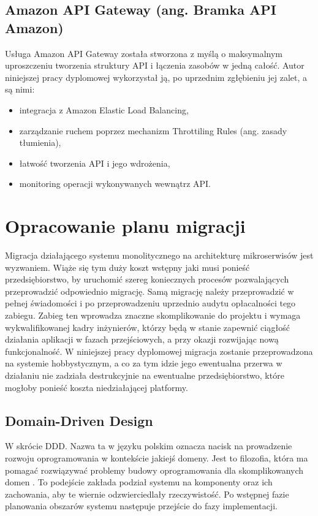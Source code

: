 \documentclass[12pt,oneside]{book}
\begin{document}
    \subsection{Amazon API Gateway (ang. Bramka API Amazon)}
    Usługa Amazon API Gateway została stworzona z myślą o maksymalnym uproszczeniu tworzenia struktury API i łączenia zasobów w jedną całość. Autor niniejszej pracy dyplomowej wykorzystał ją, po uprzednim zgłębieniu jej zalet, a są nimi:

    \begin{itemize}
        \item integracja z Amazon Elastic Load Balancing,
        \item zarządzanie ruchem poprzez mechanizm Throttiling Rules (ang. zasady tłumienia),
        \item łatwość tworzenia API i jego wdrożenia,
        \item monitoring operacji wykonywanych wewnątrz API. \cite{aws.api.gateway}
    \end{itemize}


    \section{Opracowanie planu migracji}
    Migracja działającego systemu monolitycznego na architekturę mikroserwisów jest wyzwaniem. Wiąże się tym duży koszt wstępny jaki musi ponieść przedsiębiorstwo, by uruchomić szereg koniecznych procesów pozwalających przeprowadzić odpowiednio migrację. Samą migrację należy przeprowadzić w pełnej świadomości i po przeprowadzeniu uprzednio audytu opłacalności tego zabiegu. Zabieg ten wprowadza znaczne skomplikowanie do projektu i wymaga wykwalifikowanej kadry inżynierów, którzy będą w stanie zapewnić ciągłość działania aplikacji w fazach przejściowych, a przy okazji rozwijając nową funkcjonalność.
    W niniejszej pracy dyplomowej migracja zostanie przeprowadzona na systemie hobbystycznym, a co za tym idzie jego ewentualna przerwa w działaniu nie zadziała destrukcyjnie na ewentualne przedsiębiorstwo, które mogłoby ponieść koszta niedziałającej platformy.

    \subsection{Domain-Driven Design}
    W skrócie DDD. Nazwa ta w języku polskim oznacza nacisk na prowadzenie rozwoju oprogramowania w kontekście jakiejś domeny. Jest to filozofia, która ma pomagać rozwiązywać problemy budowy oprogramowania dla skomplikowanych domen \cite{patterns.principles.and.practices.of.ddd}.
    To podejście zakłada podział systemu na komponenty oraz ich zachowania, aby te wiernie odzwierciedlały rzeczywistość. Po wstępnej fazie planowania obszarów systemu następuje przejście do fazy implementacji.
\end{document}
